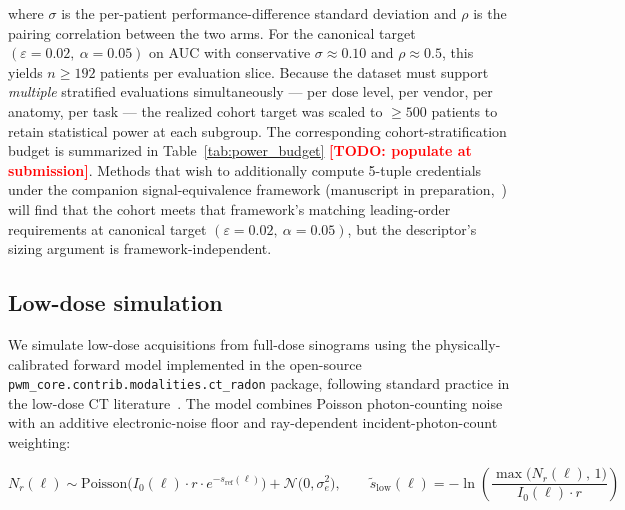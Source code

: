 \documentclass[twoside,11pt]{article}
\newcommand{\todo}[1]{\textcolor{red}{\textbf{[TODO: #1]}}}
\newcommand{\todoTable}[2]{%
  \begin{table}[ht]\centering%
    \fbox{\parbox{0.85\linewidth}{\centering\todo{TABLE: #2}}}%
    \caption{#2 (placeholder; populate when data lands).}\label{#1}%
  \end{table}}
\begin{document}
where $\sigma$ is the per-patient performance-difference standard deviation and $\rho$ is the pairing correlation between the two arms. For the canonical target $(\varepsilon = 0.02,\ \alpha = 0.05)$ on AUC with conservative $\sigma \approx 0.10$ and $\rho \approx 0.5$, this yields $n \geq 192$ patients per evaluation slice. Because the dataset must support \textit{multiple} stratified evaluations simultaneously --- per dose level, per vendor, per anatomy, per task --- the realized cohort target was scaled to $\geq 500$ patients to retain statistical power at each subgroup. The corresponding cohort-stratification budget is summarized in Table~\ref{tab:power_budget} \todo{populate at submission}. Methods that wish to additionally compute 5-tuple credentials under the companion signal-equivalence framework (manuscript in preparation,~\citealt{ws2framework}) will find that the cohort meets that framework's matching leading-order requirements at canonical target $(\varepsilon = 0.02,\ \alpha = 0.05)$, but the descriptor's sizing argument is framework-independent.

\todoTable{tab:power_budget}{Sample-size budget by stratification: rows are evaluation conditions (e.g., 25\%-dose chest, 25\%-dose abdomen, leave-one-vendor-out cross-vendor); columns give required $n$ at $(\varepsilon, \alpha) = (0.02, 0.05)$ vs realized $n$ in the released cohort}

\subsection*{Low-dose simulation}

We simulate low-dose acquisitions from full-dose sinograms using the physically-calibrated forward model implemented in the open-source \texttt{pwm\_core.contrib.modalities.ct\_radon} package, following standard practice in the low-dose CT literature~\citep{zeng2015nonlocal,wang2020deeplearningreview}. The model combines Poisson photon-counting noise with an additive electronic-noise floor and ray-dependent incident-photon-count weighting:

\begin{equation}
    N_r(\ell) \sim \textrm{Poisson}\!\big(I_0(\ell) \cdot r \cdot e^{-s_{\textrm{ref}}(\ell)}\big) + \mathcal{N}\!\big(0,\sigma_e^2\big), \qquad \tilde{s}_{\textrm{low}}(\ell) = -\ln\!\left( \frac{\max\!\big(N_r(\ell),\,1\big)}{I_0(\ell) \cdot r} \right)
    \label{eq:lowdose_sim_v1}
\end{equation}
\end{document}
